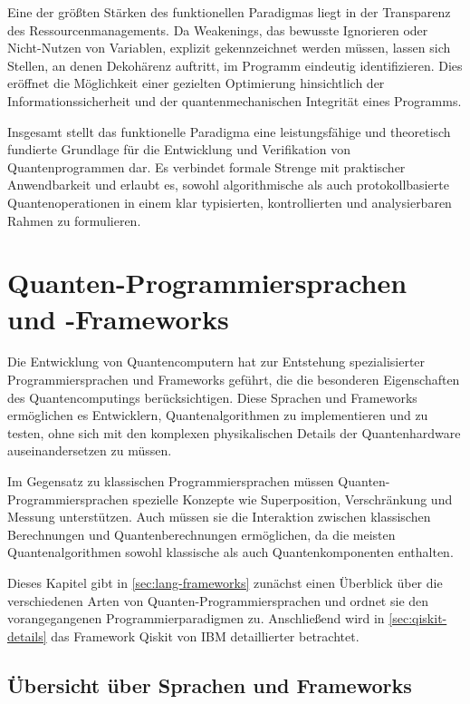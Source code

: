 Eine der größten Stärken des funktionellen Paradigmas liegt in der Transparenz des Ressourcenmanagements. Da Weakenings, das bewusste Ignorieren oder Nicht-Nutzen von Variablen, explizit gekennzeichnet werden müssen, lassen sich Stellen, an denen Dekohärenz auftritt, im Programm eindeutig identifizieren. Dies eröffnet die Möglichkeit einer gezielten Optimierung hinsichtlich der Informationssicherheit und der quantenmechanischen Integrität eines Programms.

Insgesamt stellt das funktionelle Paradigma eine leistungsfähige und theoretisch fundierte Grundlage für die Entwicklung und Verifikation von Quantenprogrammen dar. Es verbindet formale Strenge mit praktischer Anwendbarkeit und erlaubt es, sowohl algorithmische als auch protokollbasierte Quantenoperationen in einem klar typisierten, kontrollierten und analysierbaren Rahmen zu formulieren. \autocite{altenkirchFunctionalQuantumProgramming2005}

\section{Quanten-Programmiersprachen und -Frameworks}
\label{sec:programming-languages}

Die Entwicklung von Quantencomputern hat zur Entstehung spezialisierter Programmiersprachen und Frameworks geführt, die die besonderen Eigenschaften des Quantencomputings berücksichtigen. Diese Sprachen und Frameworks ermöglichen es Entwicklern, Quantenalgorithmen zu implementieren und zu testen, ohne sich mit den komplexen physikalischen Details der Quantenhardware auseinandersetzen zu müssen.

Im Gegensatz zu klassischen Programmiersprachen müssen Quanten-Programmier\-sprachen spezielle Konzepte wie Superposition, Verschränkung und Messung unterstützen. Auch müssen sie die Interaktion zwischen klassischen Berechnungen und Quantenberechnungen ermöglichen, da die meisten Quantenalgorithmen sowohl klassische als auch Quantenkomponenten enthalten.

Dieses Kapitel gibt in \autoref{sec:lang-frameworks} zunächst einen Überblick über die verschiedenen Arten von Quanten-Programmiersprachen und ordnet sie den vorangegangenen Programmierparadigmen zu. Anschließend wird in \autoref{sec:qiskit-details} das Framework Qiskit von IBM detaillierter betrachtet.

\subsection{Übersicht über Sprachen und Frameworks}
\label{sec:lang-frameworks}


